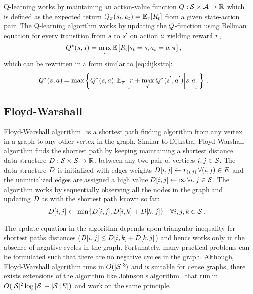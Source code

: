 Q-learning works by maintaining an action-value function $Q : \mathcal{S} \times
\mathcal{A} \rightarrow \mathbb{R}$ which is defined as the expected return
$Q_\pi(s_t, a_t) = \mathbb{E}_\pi[R_t]$ from a given state-action pair.
The Q-learning algorithm works by updating the $Q$-function using Bellman
equation for every transition from $s$ to $s'$ on action $a$
yielding reward $r$, 
%
\begin{align}
    Q^*(s, a) &= \max_{\pi} \mathbb{E}\left[R_t \middle| s_t=s, a_t=a, \pi \right] ,
\end{align}
which can be rewritten in a form similar to \eqref{eq:dijkstra}:
\begin{align}
  Q^*(s, a) &= \max \left\{
                       Q^*(s, a),
                       \mathbb{E}_{\pi}\left[
                       r + \max_{a^{'}} Q^*(s^{'}, a^{'})
                       \middle| s, a \right] \right\} \, .
    \label{eq:q-learn-bellman}
\end{align}%
%

\subsection{Floyd-Warshall}

Floyd-Warshall algorithm~\citep{floydwarshall1962} is a shortest path finding
algorithm from any vertex in a graph to any other vertex in the graph.
Similar to Dijkstra, Floyd-Warshall algorithm
finds the shortest path by keeping maintaining a shortest distance
data-structure $D : \mathcal{S} \times \mathcal{S} \rightarrow \mathbb{R}$. between any
two pair of vertices $i, j \in \mathcal{S}$.
The data-structure $D$ is initialized with edges weights
$D[i, j] \leftarrow r_{(i, j)} \, \forall (i, j) \in E$
and the uninitialized edges are assigned a high value
$D[i, j] \leftarrow \infty \, \forall i, j \in \mathcal{S}$.
The algorithm works by sequentially observing all the nodes in the graph and
updating $D$ as with the shortest path known so far:
%
\begin{align}
  D[i, j] \leftarrow \min\{ D[i, j], D[i, k] + D[k, j] \} \quad
  \forall i, j, k \in \mathcal{S} \, .
\end{align}%
%


The update equation in the algorithm depends upon triangular inequality for
shortest paths distances ($D[i, j] \le D[i, k] + D[k, j]$) and hence
works only in the absence of negative cycles in the graph. Fortunately, many
practical problems can be formulated such that there are no negative cycles
in the graph. Although, Floyd-Warshall algorithm runs in $O(|\mathcal{S}|^3)$
and is suitable for dense graphs, there exists extensions of the algorithm
like Johnson's algorithm~\citep{johnson1977efficient} that run in
$O(|\mathcal{S}|^2\log|\mathcal{S}| + |\mathcal{S}||E|)$ and work on the same
principle.

